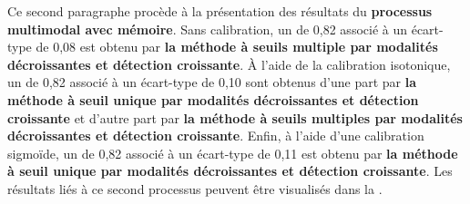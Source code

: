 Ce second paragraphe procède à la présentation des résultats du \textbf{processus multimodal avec mémoire}. Sans calibration, un \fscore{} de 0,82 associé à un écart-type de 0,08 est obtenu par \textbf{la méthode à seuils multiple par modalités décroissantes et détection croissante}. À l'aide de la calibration isotonique, un \fscore{} de 0,82 associé à un écart-type de 0,10 sont obtenus d'une part par \textbf{la méthode à seuil unique par modalités décroissantes et détection croissante} et d'autre part par \textbf{la méthode à seuils multiples par modalités décroissantes et détection croissante}. Enfin, à l'aide d'une calibration sigmoïde, un \fscore{} de 0,82 associé à un écart-type de 0,11 est obtenu par \textbf{la méthode à seuil unique par modalités décroissantes et détection croissante}. Les résultats liés à ce second processus peuvent être visualisés dans la .\par

